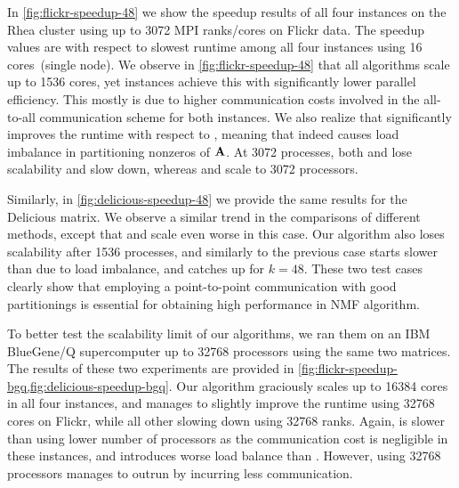 In \cref{fig:flickr-speedup-48} we show the speedup results of all four instances on the Rhea cluster using up 
to 3072 MPI ranks/cores on Flickr data.
The speedup values are with respect to slowest runtime among all four instances using 16 cores~(single node).
We observe in \cref{fig:flickr-speedup-48} that all algorithms scale up to 1536 cores, yet \mpifaun instances 
achieve this with significantly lower parallel efficiency.
This mostly is due to higher communication costs involved in the all-to-all communication scheme for both instances.
We also realize that \urp significantly improves the runtime with respect to \unp, meaning that \unp indeed causes load imbalance in partitioning nonzeros of $\mathbf{A}$.
At 3072 processes, both \urp and \unp lose scalability and slow down, whereas \cpp and \crp scale to 3072 processors.

Similarly, in \cref{fig:delicious-speedup-48} we provide the same results for the Delicious matrix.
We observe a similar trend in the comparisons of different methods, except that \urp and \unp scale even worse in this case.
Our algorithm also loses scalability after 1536 processes, and similarly to the previous case \cpp starts slower than \crp due to load imbalance, and catches up for $k = 48$.
These two test cases clearly show that employing a point-to-point communication with good partitionings is essential for obtaining high performance in NMF algorithm.

To better test the scalability limit of our algorithms, we ran them on an IBM BlueGene/Q supercomputer up to 32768 processors using the same two matrices.
The results of these two experiments are provided in \cref{fig:flickr-speedup-bgq,fig:delicious-speedup-bgq}.
Our algorithm graciously scales up to 16384 cores in all four instances, and \cpp manages to slightly improve the runtime using 32768 cores on Flickr, while all other slowing down using 32768 ranks.
Again, \cpp is slower than \crp using lower number of processors as the communication cost is negligible in these instances, and \cpp introduces worse load balance than \crp.
However, using 32768 processors \cpp manages to outrun \crp by incurring less communication.


